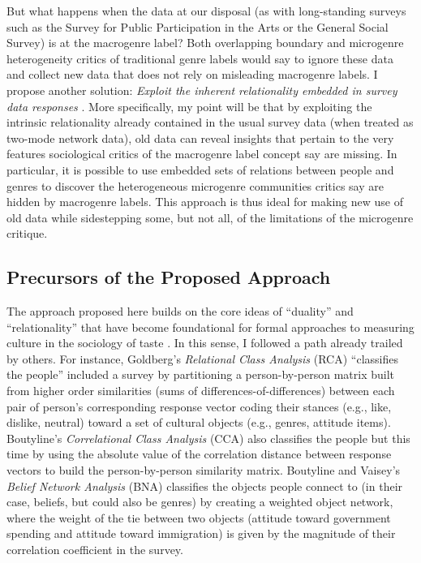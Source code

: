 \documentclass[a4paper,12pt]{article}
\begin{document}
But what happens when the data at our disposal (as with long-standing surveys such as the Survey for Public Participation in the Arts or the General Social Survey) is at the macrogenre label? Both overlapping boundary and microgenre heterogeneity critics of traditional genre labels would say to ignore these data and collect new data that does not rely on misleading macrogenre labels. I propose another solution: {\em Exploit the inherent relationality embedded in survey data responses} \citep{goldberg2011mapping, boutyline2017belief, lizardo18}. More specifically, my point will be that by exploiting the intrinsic relationality already contained in the usual survey data (when treated as two-mode network data), old data can reveal insights that pertain to the very features sociological critics of the macrogenre label concept say are missing. In particular, it is possible to use embedded sets of relations between people and genres to discover the heterogeneous microgenre communities critics say are hidden by macrogenre labels. This approach is thus ideal for making new use of old data while sidestepping some, but not all, of the limitations of the microgenre critique. 	

\subsection{Precursors of the Proposed Approach}
The approach proposed here builds on the core ideas of ``duality'' and ``relationality'' that have become foundational for formal approaches to measuring culture in the sociology of taste \citep{mutzel2020duality, mohr2015formal}. In this sense, I followed a path already trailed by others. For instance, Goldberg's \citeyearpar{goldberg2011mapping} {\em Relational Class Analysis} (RCA) ``classifies the people''  included a survey by partitioning a person-by-person matrix built from higher order similarities (sums of differences-of-differences) between each pair of person's corresponding response vector coding their stances (e.g., like, dislike, neutral) toward a set of cultural objects (e.g., genres, attitude items). Boutyline's \citeyearpar{boutyline2017improving} {\em Correlational Class Analysis} (CCA) also classifies the people but this time by using the absolute value of the correlation distance between response vectors to build the person-by-person similarity matrix. Boutyline and Vaisey's {\em Belief Network Analysis} (BNA) classifies the objects people connect to (in their case, beliefs, but could also be genres) by creating a weighted object network, where the weight of the tie between two objects (attitude toward government spending and attitude toward immigration) is given by the magnitude of their correlation coefficient in the survey. 
\end{document}
